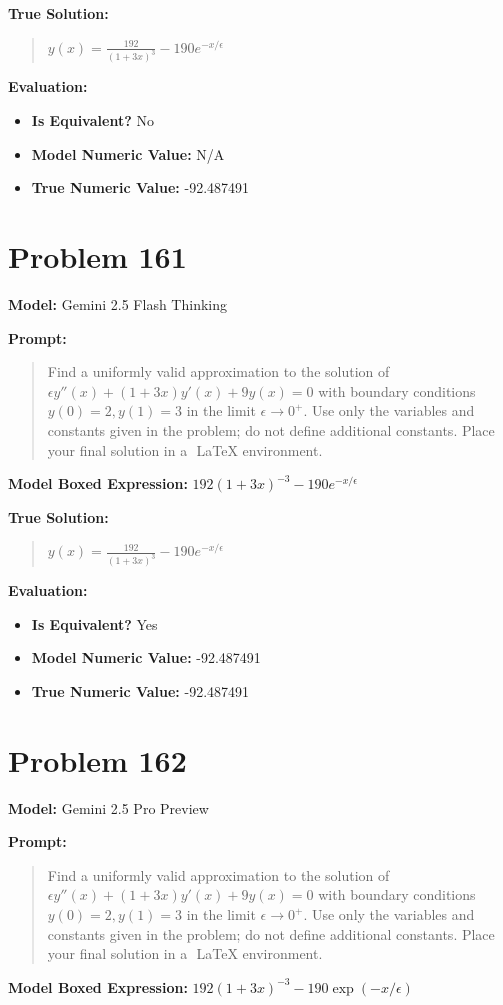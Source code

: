 \documentclass{article}
\begin{document}
{\textbf{True Solution:}
\begin{quote}
$y(x) = \frac{192}{(1+3x)^3} - 190 e^{-x/ \epsilon}$
\end{quote}

\textbf{Evaluation:}
\begin{itemize}
\item \textbf{Is Equivalent?} No
\item \textbf{Model Numeric Value:} N/A
\item \textbf{True Numeric Value:} -92.487491
\end{itemize}
\vspace{1cm}
\section*{Problem 161}
\textbf{Model:} Gemini 2.5 Flash Thinking

\textbf{Prompt:}
\begin{quote}
Find a uniformly valid approximation to the solution of $\epsilon y''(x)+(1+3x)y'(x)+9y(x)=0$ with boundary conditions $y(0)=2,y(1)=3$ in the limit $\epsilon \to 0^+$. Use only the variables and constants given in the problem; do not define additional constants. Place your final solution in a $\boxed{}$ LaTeX environment.
\end{quote}
\textbf{Model Boxed Expression:} $192(1+3x)^{-3} - 190e^{-x/\epsilon}$

\textbf{True Solution:}
\begin{quote}
$y(x) = \frac{192}{(1+3x)^3} - 190 e^{-x/ \epsilon}$
\end{quote}

\textbf{Evaluation:}
\begin{itemize}
\item \textbf{Is Equivalent?} Yes
\item \textbf{Model Numeric Value:} -92.487491
\item \textbf{True Numeric Value:} -92.487491
\end{itemize}
\vspace{1cm}
\section*{Problem 162}
\textbf{Model:} Gemini 2.5 Pro Preview

\textbf{Prompt:}
\begin{quote}
Find a uniformly valid approximation to the solution of $\epsilon y''(x)+(1+3x)y'(x)+9y(x)=0$ with boundary conditions $y(0)=2,y(1)=3$ in the limit $\epsilon \to 0^+$. Use only the variables and constants given in the problem; do not define additional constants. Place your final solution in a $\boxed{}$ LaTeX environment.
\end{quote}
\textbf{Model Boxed Expression:} $192(1+3x)^{-3} - 190\exp(-x/\epsilon)$

}
\end{document}
